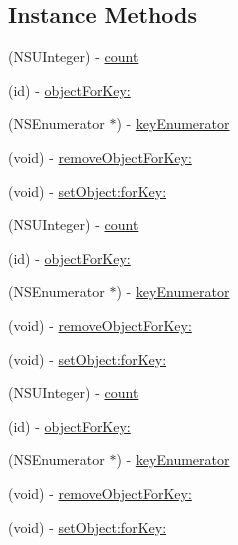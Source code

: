 \subsection*{Instance Methods}
\begin{DoxyCompactItemize}
\item 
(N\+S\+U\+Integer) -\/ \hyperlink{protocolFBGraphObject-p_aaf8c8d696ae643db005f3562ab51fca1}{count}
\item 
(id) -\/ \hyperlink{protocolFBGraphObject-p_a2ca53cdc300a46e5cdbfe0a2ae705f45}{object\+For\+Key\+:}
\item 
(N\+S\+Enumerator $\ast$) -\/ \hyperlink{protocolFBGraphObject-p_a8df88c6df762bb207cea390c8ef5d048}{key\+Enumerator}
\item 
(void) -\/ \hyperlink{protocolFBGraphObject-p_ae70776266993262a70b438421f1e0209}{remove\+Object\+For\+Key\+:}
\item 
(void) -\/ \hyperlink{protocolFBGraphObject-p_a9b7573bc6e372ff8f4f33c3d144ea620}{set\+Object\+:for\+Key\+:}
\item 
(N\+S\+U\+Integer) -\/ \hyperlink{protocolFBGraphObject-p_aaf8c8d696ae643db005f3562ab51fca1}{count}
\item 
(id) -\/ \hyperlink{protocolFBGraphObject-p_a2ca53cdc300a46e5cdbfe0a2ae705f45}{object\+For\+Key\+:}
\item 
(N\+S\+Enumerator $\ast$) -\/ \hyperlink{protocolFBGraphObject-p_a8df88c6df762bb207cea390c8ef5d048}{key\+Enumerator}
\item 
(void) -\/ \hyperlink{protocolFBGraphObject-p_ae70776266993262a70b438421f1e0209}{remove\+Object\+For\+Key\+:}
\item 
(void) -\/ \hyperlink{protocolFBGraphObject-p_a9b7573bc6e372ff8f4f33c3d144ea620}{set\+Object\+:for\+Key\+:}
\item 
(N\+S\+U\+Integer) -\/ \hyperlink{protocolFBGraphObject-p_aaf8c8d696ae643db005f3562ab51fca1}{count}
\item 
(id) -\/ \hyperlink{protocolFBGraphObject-p_a2ca53cdc300a46e5cdbfe0a2ae705f45}{object\+For\+Key\+:}
\item 
(N\+S\+Enumerator $\ast$) -\/ \hyperlink{protocolFBGraphObject-p_a8df88c6df762bb207cea390c8ef5d048}{key\+Enumerator}
\item 
(void) -\/ \hyperlink{protocolFBGraphObject-p_ae70776266993262a70b438421f1e0209}{remove\+Object\+For\+Key\+:}
\item 
(void) -\/ \hyperlink{protocolFBGraphObject-p_a9b7573bc6e372ff8f4f33c3d144ea620}{set\+Object\+:for\+Key\+:}
\item 

\end{DoxyCompactItemize}
